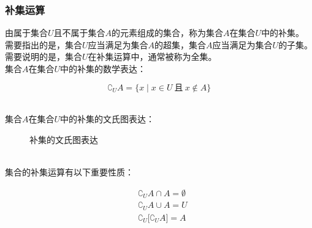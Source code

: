 \documentclass[UTF8]{ctexart}
\begin{document}
\newpage

\subsubsection{补集运算}
    由属于集合$U$且不属于集合$A$的元素组成的集合，称为集合$A$在集合$U$中的补集。\\[3mm]
    需要指出的是，集合$U$应当满足为集合$A$的超集，集合$A$应当满足为集合$U$的子集。\\[3mm]
    需要说明的是，集合$U$在补集运算中，通常被称为全集。\\[4mm]
    集合$A$在集合$U$中的补集的数学表达：
    \begin{large}
        \begin{equation*}
            \complement_UA=\big\{ x\mid x\in U~\text{且}~x\notin A\big\}
        \end{equation*}
    \end{large}\\
    集合$A$在集合$U$中的补集的文氏图表达：\vspace{3pt}
    \begin{figure}[h]
        \begin{center}
            \caption{补集的文氏图表达}
        \end{center}
    \end{figure}\\
    集合的补集运算有以下重要性质：
    \begin{large}
        \begin{align*}
            &\complement_UA\cap A=\emptyset\\[3mm]
            &\complement_UA\cup A=U\\[3mm]
            &\complement_U\big[\complement_UA\big]=A
        \end{align*}
    \end{large}

\newpage
\end{document}

